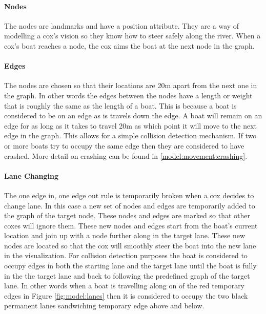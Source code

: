       \paragraph{Nodes}  
      The nodes are landmarks and have a position attribute. They are a way of modelling a cox's vision so they know how to steer safely along the river. When a cox's boat reaches a node, the cox aims the boat at the next node in the graph.
      
      \paragraph{Edges}
      The nodes are chosen so that their locations are 20m apart from the next one in the graph. In other words the edges between the nodes have a length or weight that is roughly the same as the length of a boat. This is because a boat is considered to be on an edge as is travels down the edge. A boat will remain on an edge for as long as it takes to travel 20m as which point it will move to the next edge in the graph. This allows for a simple collision detection mechanism. If two or more boats try to occupy the same edge then they are considered to have crashed. More detail on crashing can be found in \ref{model:movement:crashing}.
        
      \paragraph{Lane Changing}
      The one edge in, one edge out rule is temporarily broken when a cox decides to change lane. In this case a new set of nodes and edges are temporarily added to the graph of the target node. These nodes and edges are marked so that other coxes will ignore them. These new nodes and edges start from the boat's current location and join up with a node further along in the target lane. These new nodes are located so that the cox will smoothly steer the boat into the new lane in the visualization. For collision detection purposes the boat is considered to occupy edges in both the starting lane and the target lane until the boat is fully in the the target lane and back to following the predefined graph of the target lane. In other words when a boat is travelling along on of the red temporary edges in Figure \ref{fig:model:lanes} then it is considered to occupy the two black permanent lanes sandwiching temporary edge above and below.

